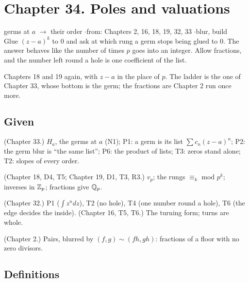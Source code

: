 \section*{Chapter 34. Poles and valuations}
\begin{center}
{\normalsize germs at $a$ $\to$ their order \quad$\cdot$\quad from: Chapters 2, 16, 18, 19, 32, 33 \quad$\cdot$\quad blur, build}\\[4pt]
{\small Glue $(z - a)^k$ to $0$ and ask at which rung a germ stops being glued to $0$. The answer behaves like the number of times $p$ goes into an integer. Allow fractions, and the number left round a hole is one coefficient of the list.}
\end{center}

Chapters 18 and 19 again, with $z - a$ in the place of $p$. The ladder is the one of Chapter 33, whose bottom is the germ; the fractions are Chapter 2 run once more.

\subsection*{Given}

\begin{lines}
\item[\lab{G1}] (Chapter 33.) $H_a$, the germs at $a$ (N1); P1: a germ is its list $\sum c_n (z - a)^n$; P2: the germ blur is ``the same list''; P6: the product of lists; T3: zeros stand alone; T2: slopes of every order.
\item[\lab{G2}] (Chapter 18, D4, T5; Chapter 19, D1, T3, R3.) $v_p$; the rungs $\equiv_k$ mod $p^k$; inverses in $\mathbb{Z}_p$; fractions give $\mathbb{Q}_p$.
\item[\lab{G3}] (Chapter 32.) P1 ($\int z^n dz$), T2 (no hole), T4 (one number round a hole), T6 (the edge decides the inside). (Chapter 16, T5, T6.) The turning form; turns are whole.
\item[\lab{G4}] (Chapter 2.) Pairs, blurred by $(f, g) \sim (fh, gh)$: fractions of a floor with no zero divisors.
\end{lines}

\subsection*{Definitions}

